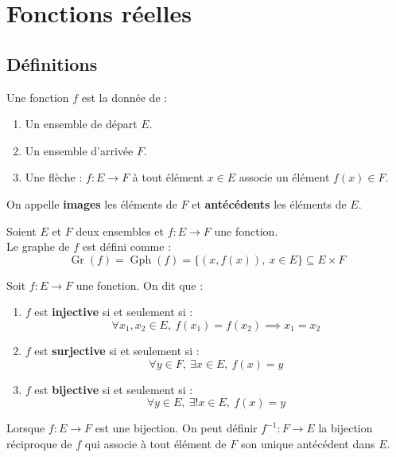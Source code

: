 \chapter{Fonctions réelles}
\def\arraystretch{1}

\section{Définitions}
\begin{definition}[Fonction]
	Une fonction $f$ est la donnée de :
	\begin{enumerate}
		\item Un ensemble de départ $E$.
		\item Un ensemble d'arrivée $F$.
		\item Une flèche : $ f : E \to F $ à tout élément $x \in E$ associe un élément $f(x) \in F$.
	\end{enumerate}		
	On appelle \textbf{images} les éléments de $F$ et \textbf{antécédents} les éléments de $E$.
\end{definition}

\begin{definition}
	Soient $E$ et $F$ deux ensembles et $f : E \to F$ une fonction.
	\\
	Le graphe de $f$ est défini comme :
	\[ \operatorname{Gr}(f) = \operatorname{Gph}(f) = \{ (x, f(x)),\ x \in E \} \subseteq E \times F \] 
\end{definition}

\begin{definition}
	Soit $f : E \to F$ une fonction. On dit que :
    \begin{enumerate}
        \item $f$ est \textbf{injective} si et seulement si : 
        \[ \forall x_1, x_2 \in E,\ f(x_1) = f(x_2) \implies x_1 = x_2 \]
        \item $f$ est \textbf{surjective} si et seulement si : 
        \[ \forall y \in F,\ \exists x \in E,\ f(x) = y \]
        \item $f$ est \textbf{bijective} si et seulement si :
        \[ \forall y \in E,\ \exists ! x \in E,\ f(x) = y \]
    \end{enumerate}
\end{definition}

\begin{definition}
	Lorsque $f : E \to F$ est une bijection. On peut définir $f^{-1} : F \to E$ la bijection réciproque de $f$ qui associe à tout élément de $F$ son unique antécédent dans $E$.
\end{definition}

